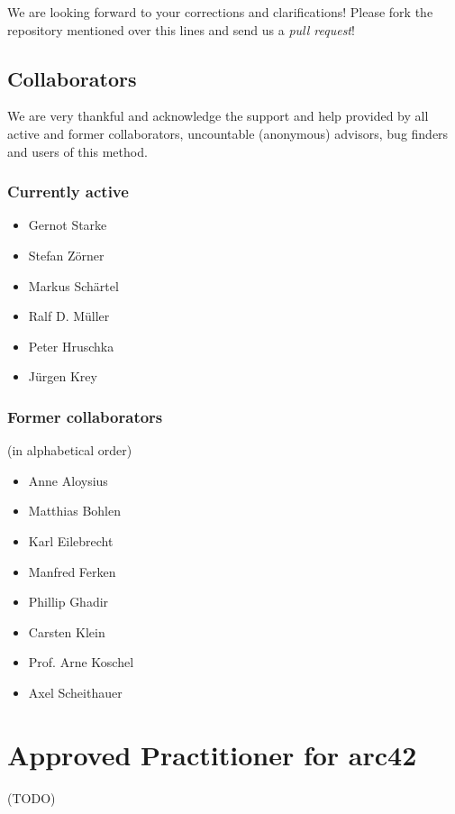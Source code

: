 \documentclass[]{article}
\begin{document}
We are looking forward to your corrections and clarifications! Please
fork the repository mentioned over this lines and send us a \emph{pull
request}!

\subsection{Collaborators}

We are very thankful and acknowledge the support and help provided by
all active and former collaborators, uncountable (anonymous) advisors,
bug finders and users of this method.

\subsubsection{Currently active}

\begin{itemize}
\item
  Gernot Starke
\item
  Stefan Zörner
\item
  Markus Schärtel
\item
  Ralf D. Müller
\item
  Peter Hruschka
\item
  Jürgen Krey
\end{itemize}

\subsubsection{Former collaborators}

(in alphabetical order)

\begin{itemize}
\item
  Anne Aloysius
\item
  Matthias Bohlen
\item
  Karl Eilebrecht
\item
  Manfred Ferken
\item
  Phillip Ghadir
\item
  Carsten Klein
\item
  Prof. Arne Koschel
\item
  Axel Scheithauer
\end{itemize}

\section{Approved Practitioner for arc42}

(TODO)
\end{document}
